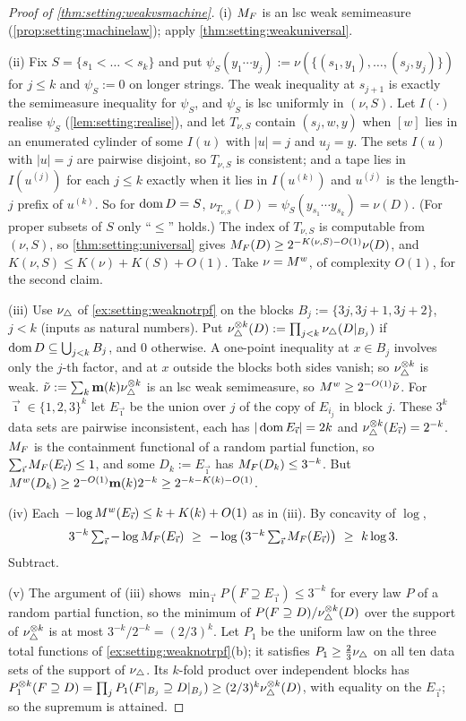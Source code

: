 \begin{proof}[Proof of \cref{thm:setting:weakvsmachine}]
(i) $M_{F}$ is an lsc weak semimeasure (\cref{prop:setting:machinelaw}); apply \cref{thm:setting:weakuniversal}.

(ii) Fix $S=\{s_1<\dots<s_k\}$ and put $\psi_S(y_1\cdots y_j):=\nu(\{(s_1,y_1),\dots,(s_j,y_j)\})$ for $j\le k$ and $\psi_S:=0$ on longer strings. The weak inequality at $s_{j+1}$ is exactly the semimeasure inequality for $\psi_S$, and $\psi_S$ is lsc uniformly in $(\nu,S)$. Let $I(\cdot)$ realise $\psi_S$ (\cref{lem:setting:realise}), and let $T_{\nu,S}$ contain $(s_j,w,y)$ when $[w]$ lies in an enumerated cylinder of some $I(u)$ with $|u|=j$ and $u_j=y$. The sets $I(u)$ with $|u|=j$ are pairwise disjoint, so $T_{\nu,S}$ is consistent; and a tape lies in $I(u^{(j)})$ for each $j\le k$ exactly when it lies in $I(u^{(k)})$ and $u^{(j)}$ is the length-$j$ prefix of $u^{(k)}$. So for $\operatorname{dom} D=S$, $\nu_{T_{\nu,S}}(D)=\psi_S(y_{s_1}\cdots y_{s_k})=\nu(D)$. (For proper subsets of $S$ only ``$\le$'' holds.) The index of $T_{\nu,S}$ is computable from $(\nu,S)$, so \cref{thm:setting:universal} gives $M_{F}(D)\ge2^{-K(\nu,S)-O(1)}\nu(D)$, and $K(\nu,S)\le K(\nu)+K(S)+O(1)$. Take $\nu=M^{w}$, of complexity $O(1)$, for the second claim.

(iii) Use $\nu_{\triangle}$ of \cref{ex:setting:weaknotrpf} on the blocks $B_j:=\{3j,3j+1,3j+2\}$, $j<k$ (inputs as natural numbers). Put $\nu_{\triangle}^{\otimes k}(D):=\prod_{j<k}\nu_{\triangle}(D|_{B_j})$ if $\operatorname{dom} D\subseteq\bigcup_{j<k}B_j$, and $0$ otherwise. A one-point inequality at $x\in B_j$ involves only the $j$-th factor, and at $x$ outside the blocks both sides vanish; so $\nu_{\triangle}^{\otimes k}$ is weak. $\tilde\nu:=\sum_k\mathbf{m}(k)\nu_{\triangle}^{\otimes k}$ is an lsc weak semimeasure, so $M^{w}\ge2^{-O(1)}\tilde\nu$. For $\vec\imath\in\{1,2,3\}^k$ let $E_{\vec\imath}$ be the union over $j$ of the copy of $E_{i_j}$ in block $j$. These $3^k$ data sets are pairwise inconsistent, each has $|\operatorname{dom} E_{\vec\imath}|=2k$ and $\nu_{\triangle}^{\otimes k}(E_{\vec\imath})=2^{-k}$. $M_{F}$ is the containment functional of a random partial function, so $\sum_{\vec\imath}M_{F}(E_{\vec\imath})\le1$, and some $D_k:=E_{\vec\imath}$ has $M_{F}(D_k)\le3^{-k}$. But $M^{w}(D_k)\ge2^{-O(1)}\mathbf{m}(k)2^{-k}\ge2^{-k-K(k)-O(1)}$.

(iv) Each $-\log M^{w}(E_{\vec\imath})\le k+K(k)+O(1)$ as in (iii). By concavity of $\log$,
\[
3^{-k}\textstyle\sum_{\vec\imath}-\log\MF(E_{\vec\imath})\ \ge\ -\log\big(3^{-k}\sum_{\vec\imath}\MF(E_{\vec\imath})\big)\ \ge\ k\log3 .
\]
Subtract.

(v) The argument of (iii) shows $\min_{\vec\imath}P(F\supseteq E_{\vec\imath})\le3^{-k}$ for every law $P$ of a random partial function, so the minimum of $P(F\supseteq D)/\nu_{\triangle}^{\otimes k}(D)$ over the support of $\nu_{\triangle}^{\otimes k}$ is at most $3^{-k}/2^{-k}=(2/3)^k$. Let $P_1$ be the uniform law on the three total functions of \cref{ex:setting:weaknotrpf}(b); it satisfies $P_1\ge\frac23\nu_{\triangle}$ on all ten data sets of the support of $\nu_{\triangle}$. Its $k$-fold product over independent blocks has $P_1^{\otimes k}(F\supseteq D)=\prod_jP_1(F|_{B_j}\supseteq D|_{B_j})\ge(2/3)^k\nu_{\triangle}^{\otimes k}(D)$, with equality on the $E_{\vec\imath}$; so the supremum is attained.
\end{proof}

